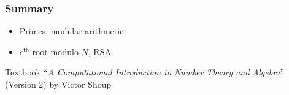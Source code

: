 \begin{comment}
\begin{frame}\frametitle{Constructing One-Way Functions}
\begin{algorithm}[H]
\SetKwInOut{Input}{input}
\SetKwInOut{Output}{output}
\SetKw{KwC}{compute}
\SetKw{KwL}{LOOP}
\DontPrintSemicolon
\caption{Algorithm computing $f_{\mathsf{GenModulus}}$}
\Input{String $x$}
\Output{String $N$}
\BlankLine

\KwC $n$ such that $p(n) \le \abs{x} < p(n+1)$\;
\KwC $(N,p,q) := \mathsf{GenModulus}(1^n;x)$\;
\tcc{run $\mathsf{GenModulus}(1^n)$ using $x$ as the random tape}
\Return $N$\;
\end{algorithm}
Reduce the factoring problem to the inverting problem.
\begin{theorem}
If the factoring problem is hard relative to $\mathsf{GenModulus}$, then $f_{\mathsf{GenModulus}}$ is a one-way function.
\end{theorem}
\end{frame}
\begin{frame}\frametitle{Constructing One-Way Permutations}
\begin{construction}
Define a family of permutations with $\mathsf{GenRSA}$:
\begin{itemize}
\item $\mathsf{Gen}$: on input $1^n$, run $\mathsf{GenRSA}(1^n)$ to obtain $(N,e,d)$ and output $I=\langle N,e \rangle$, Set $\mathcal{D}_I = \mathbb{Z}^*_N$.
\item $\mathsf{Samp}$: on input $I=\langle N,e \rangle$, choose a random elements of $\mathbb{Z}^*_N$.
\item $f$: on input $I=\langle N,e\rangle$ and $x \in \mathbb{Z}^*_N$, output $[ x^e \bmod N]$.
\end{itemize}
\end{construction}
Reduce the RSA problem to the inverting problem.
\end{frame}
\end{comment}
\begin{frame}\frametitle{Summary}
\begin{itemize}
\item Primes, modular arithmetic.
\item $e^{\mathsf{th}}$-root modulo $N$, RSA.
\end{itemize}
\begin{block}{Textbook}
``\emph{A Computational Introduction to Number Theory and Algebra}''
(Version 2) by Victor Shoup
\end{block}
\end{frame}
